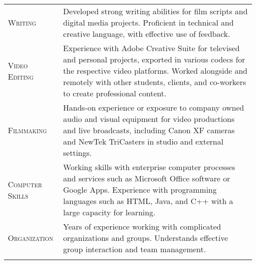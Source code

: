\documentclass[a4paper, oneside, final]{scrartcl} %
\begin{document}
\begin{center}
\begin{tabularx}{0.97\linewidth}{>{\raggedleft\scshape}p{2cm}X}
	Writing& Developed strong writing abilities for film scripts and digital media projects. Proficient in technical and creative language, with effective use of feedback.\\
\arrayrulecolor{gray}\hline
	Video Editing& Experience with Adobe Creative Suite for televised and personal projects, exported in various codecs for the respective video platforms. Worked alongside and remotely with other students, clients, and co-workers to create professional content.\\
\arrayrulecolor{gray}\hline
	Filmmaking & Hands-on experience or exposure to company owned audio and visual equipment for video productions and live broadcasts, including Canon XF cameras and NewTek TriCasters in studio and external settings.\\
\arrayrulecolor{gray}\hline
	Computer Skills& Working skills with enterprise computer processes and services such as Microsoft Office software or Google Apps. Experience with programming languages such as HTML, Java, and C++ with a large capacity for learning.\\
\arrayrulecolor{gray}\hline
	Organization & Years of experience working with complicated organizations and groups. Understands effective group interaction and team management.\\
\arrayrulecolor{gray}\hline
\end{tabularx}



\end{center}
\end{document}
